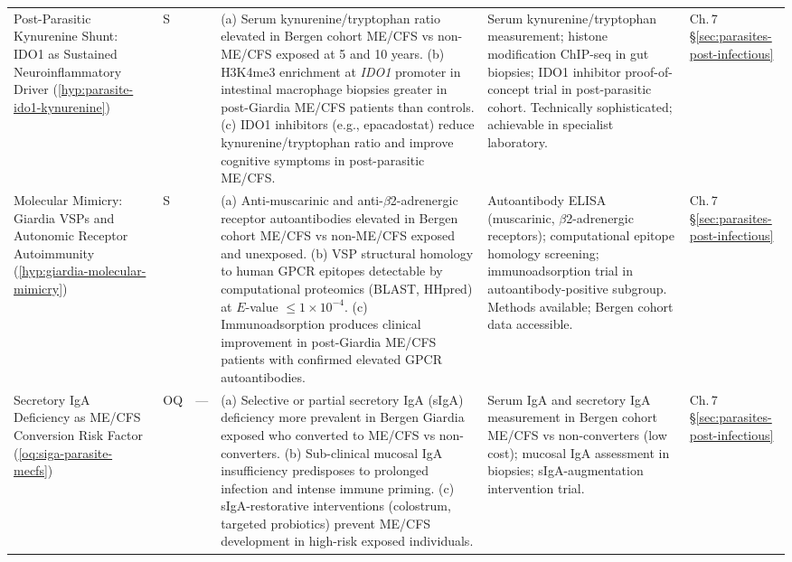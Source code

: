 \begin{longtable}{%
  p{3.0cm}
  >{\centering\arraybackslash}p{0.55cm}
  >{\centering\arraybackslash}p{1.0cm}
  p{3.8cm}
  p{3.8cm}
  p{2.2cm}
}
Post-Parasitic Kynurenine Shunt: IDO1 as Sustained Neuroinflammatory Driver
(\ref{hyp:parasite-ido1-kynurenine})
&
S & 0.35
&
(a) Serum kynurenine/tryptophan ratio elevated in Bergen cohort ME/CFS vs non-ME/CFS exposed at 5 and 10 years.
(b) H3K4me3 enrichment at \textit{IDO1} promoter in intestinal macrophage biopsies
greater in post-Giardia ME/CFS patients than controls.
(c) IDO1 inhibitors (e.g., epacadostat) reduce kynurenine/tryptophan ratio and improve
cognitive symptoms in post-parasitic ME/CFS.
&
Serum kynurenine/tryptophan measurement; histone modification ChIP-seq in gut
biopsies; IDO1 inhibitor proof-of-concept trial in post-parasitic cohort.
Technically sophisticated; achievable in specialist laboratory.
&
Ch.\,7 \S\ref{sec:parasites-post-infectious} \\[6pt]

Molecular Mimicry: Giardia VSPs and Autonomic Receptor Autoimmunity
(\ref{hyp:giardia-molecular-mimicry})
&
S & 0.30
&
(a) Anti-muscarinic and anti-$\beta$2-adrenergic receptor autoantibodies elevated
in Bergen cohort ME/CFS vs non-ME/CFS exposed and unexposed.
(b) VSP structural homology to human GPCR epitopes detectable by computational
proteomics (BLAST, HHpred) at $E$-value $\leq 1 \times 10^{-4}$.
(c) Immunoadsorption produces clinical improvement in post-Giardia ME/CFS patients
with confirmed elevated GPCR autoantibodies.
&
Autoantibody ELISA (muscarinic, $\beta$2-adrenergic receptors); computational
epitope homology screening; immunoadsorption trial in autoantibody-positive subgroup.
Methods available; Bergen cohort data accessible.
&
Ch.\,7 \S\ref{sec:parasites-post-infectious} \\[6pt]

Secretory IgA Deficiency as ME/CFS Conversion Risk Factor
(\ref{oq:siga-parasite-mecfs})
&
OQ & ---
&
(a) Selective or partial secretory IgA (sIgA) deficiency more prevalent in
Bergen Giardia exposed who converted to ME/CFS vs non-converters.
(b) Sub-clinical mucosal IgA insufficiency predisposes to prolonged infection
and intense immune priming.
(c) sIgA-restorative interventions (colostrum, targeted probiotics) prevent
ME/CFS development in high-risk exposed individuals.
&
Serum IgA and secretory IgA measurement in Bergen cohort ME/CFS vs non-converters
(low cost); mucosal IgA assessment in biopsies; sIgA-augmentation intervention trial.
&
Ch.\,7 \S\ref{sec:parasites-post-infectious} \\[6pt]


\end{longtable}
